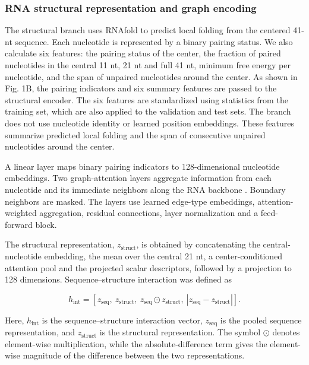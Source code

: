 \documentclass[unnumsec,webpdf,contemporary,large]{oup-authoring-template}
\begin{document}
\subsubsection{RNA structural representation and graph encoding}

The structural branch uses RNAfold \citep{ref22} to predict local folding from the centered 41-nt sequence. Each nucleotide is represented by a binary pairing status. We also calculate six features: the pairing status of the center, the fraction of paired nucleotides in the central 11 nt, 21 nt and full 41 nt, minimum free energy per nucleotide, and the span of unpaired nucleotides around the center. As shown in Fig. 1B, the pairing indicators and six summary features are passed to the structural encoder. The six features are standardized using statistics from the training set, which are also applied to the validation and test sets. The branch does not use nucleotide identity or learned position embeddings. These features summarize predicted local folding and the span of consecutive unpaired nucleotides around the center.

A linear layer maps binary pairing indicators to 128-dimensional nucleotide embeddings. Two graph-attention layers aggregate information from each nucleotide and its immediate neighbors along the RNA backbone \citep{ref32}. Boundary neighbors are masked. The layers use learned edge-type embeddings, attention-weighted aggregation, residual connections, layer normalization and a feed-forward block.

The structural representation, $z_{\mathrm{struct}}$, is obtained by concatenating the central-nucleotide embedding, the mean over the central 21 nt, a center-conditioned attention pool and the projected scalar descriptors, followed by a projection to 128 dimensions. Sequence--structure interaction was defined as

\begin{equation}
h_{\mathrm{int}} = [z_{\mathrm{seq}},\ z_{\mathrm{struct}},\ z_{\mathrm{seq}}\odot z_{\mathrm{struct}},\ |z_{\mathrm{seq}}-z_{\mathrm{struct}}|].
\end{equation}

Here, $h_{\mathrm{int}}$ is the sequence--structure interaction vector, $z_{\mathrm{seq}}$ is the pooled sequence representation, and $z_{\mathrm{struct}}$ is the structural representation. The symbol $\odot$ denotes element-wise multiplication, while the absolute-difference term gives the element-wise magnitude of the difference between the two representations.
\end{document}
